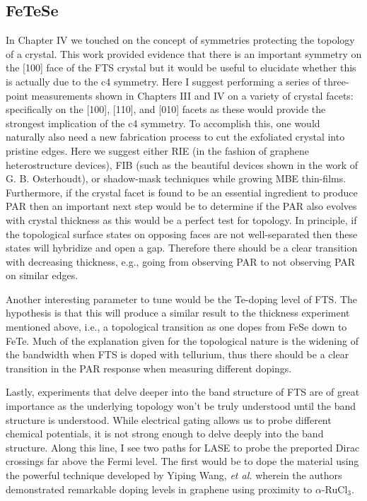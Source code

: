 \subsection{FeTeSe}
In Chapter IV we touched on the concept of symmetries protecting the topology of a crystal. This work provided evidence that there is an important symmetry on the [100] face of the \ac{FTS} crystal but it would be useful to elucidate whether this is actually due to the c4 symmetry. Here I suggest performing a series of three-point measurements shown in Chapters III and IV on a variety of crystal facets: specifically on the [100], [110], and [010] facets as these would provide the strongest implication of the c4 symmetry. To accomplish this, one would naturally also need a new fabrication process to cut the exfoliated crystal into pristine edges. Here we suggest either RIE (in the fashion of graphene heterostructure devices), FIB (such as the beautiful devices shown in the work of G. B. Osterhoudt\cite{Osterhoudt2019}), or shadow-mask techniques while growing MBE thin-films. Furthermore, if the crystal facet is found to be an essential ingredient to produce \ac{PAR} then an important next step would be to determine if the \ac{PAR} also evolves with crystal thickness as this would be a perfect test for topology. In principle, if the topological surface states on opposing faces are not well-separated then these states will hybridize and open a gap. Therefore there should be a clear transition with decreasing thickness, e.g., going from observing \ac{PAR} to not observing \ac{PAR} on similar edges.\par
{}\par
Another interesting parameter to tune would be the Te-doping level of \ac{FTS}. The hypothesis is that this will produce a similar result to the thickness experiment mentioned above, i.e., a topological transition as one dopes from FeSe down to FeTe. Much of the explanation given for the topological nature is the widening of the bandwidth when FTS is doped with tellurium, thus there should be a clear transition in the \ac{PAR} response when measuring different dopings.\par
Lastly, experiments that delve deeper into the band structure of \ac{FTS} are of great importance as the underlying topology won't be truly understood until the band structure is understood. While electrical gating allows us to probe different chemical potentials, it is not strong enough to delve deeply into the band structure. Along this line, I see two paths for LASE to probe the preported Dirac crossings far above the Fermi level. The first would be to dope the material using the powerful technique developed by Yiping Wang, \textit{et al.} wherein the authors demonstrated remarkable doping levels in graphene using proximity to $\alpha$-RuCl$_{3}$. 
